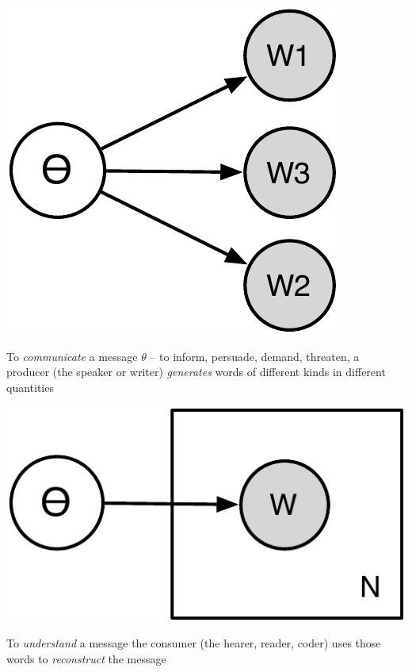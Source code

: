 \documentclass[11pt,compress,professionalfonts]{beamer}
\begin{document}
\begin{center}
\includegraphics[scale=.9]{pictures/gen}
\end{center}


To \textsl{communicate} a message $\theta$ -- to inform, persuade, demand, threaten, a producer (the speaker or writer) \textsl{generates} words of different kinds in different quantities


\begin{center}
\includegraphics[scale=.9]{pictures/gen-plate}
\end{center}



To \textsl{understand} a message the consumer (the hearer, reader, coder) uses those words to \textsl{reconstruct} the message
\end{document}

